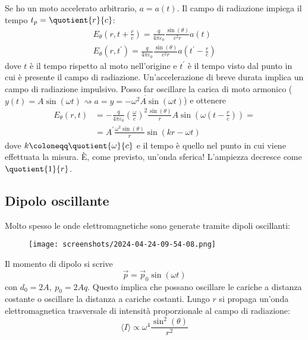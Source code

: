 Se ho un moto accelerato arbitrario, \(a = a(t)\). Il campo di radiazione impiega il tempo \(t_p =\quotient{r}{c} \):
\begin{gather}
	E_{\theta }(r,t+\frac{r}{c}) = \frac{q}{4 \pi \varepsilon _0} \frac{\sin(\theta )}{c^{2} r}a(t)\\
	E_{\theta }(r,t^{\prime} ) = \frac{q}{4 \pi \varepsilon _0}\frac{\sin (\theta )}{c^{2} r}a \left( t^{\prime} - \frac{r}{c} \right) 
\end{gather}
dove \(t\) è il tempo rispetto al moto nell'origine e \(t^{\prime} \) è il tempo visto dal punto in cui è presente il campo di radiazione. Un'accelerazione di breve durata implica un campo di radiazione impulsivo. Posso far oscillare la carica di moto armonico (\(y(t) = A \sin (\omega t) \rightsquigarrow a = \ddot{y = - \omega ^{2} A \sin (\omega t)}\)) e ottenere
\begin{align}
	E_{\theta }(r,t) &= - \frac{q}{4 \pi \varepsilon _0} \left( \frac{\omega }{c} \right)^{2} \frac{\sin (\theta )}{r} A \sin \left( \omega \left( t- \frac{r}{c} \right)  \right) =  \\
	&= A^{\prime} \frac{\omega ^{2} \sin (\theta )}{r} \sin (kr - \omega t)   
\end{align}
dove \(k \coloneqq \quotient{\omega }{c} \) e il tempo è quello nel punto in cui viene effettuata la misura. È, come previsto, un'onda sferica! L'ampiezza decresce come \(\quotient{1}{r} \).

\subsection{Dipolo oscillante}
Molto spesso le onde elettromagnetiche sono generate tramite dipoli oscillanti:
\begin{figure}[H]
	\centering
	\texttt{[image: screenshots/2024-04-24-09-54-08.png]}
\end{figure}
Il momento di dipolo si scrive
\begin{equation}
	\vec{p} = \vec{p}_0 \sin (\omega t)
\end{equation}
con \(d_0 = 2A,\ p_0 = 2Aq\). Questo implica che possano oscillare le cariche a distanza costante o oscillare la distanza a cariche costanti. Lungo \(r\) si propaga un'onda elettromagnetica trasversale di intensità proporzionale al campo di radiazione:
\begin{equation}
	\langle I \rangle \propto \omega ^4 \frac{\sin ^{2} (\theta )}{r ^{2} }
\end{equation}

